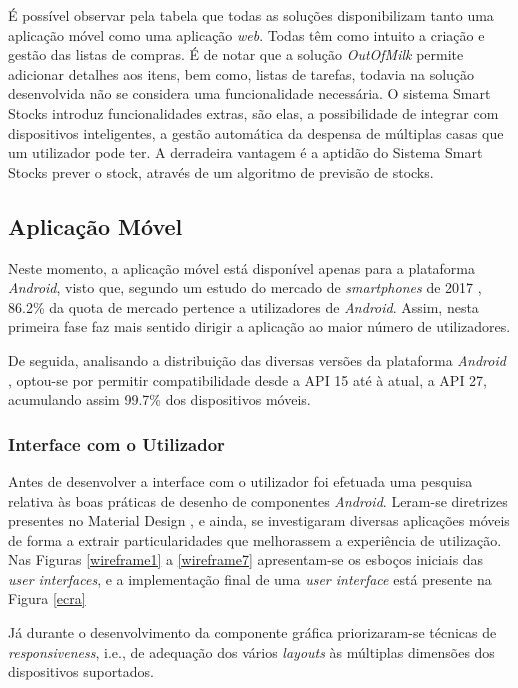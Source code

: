 É possível observar pela tabela que todas as soluções disponibilizam tanto uma aplicação móvel como uma aplicação \textit{web}. Todas têm como intuito a criação e gestão das listas de compras. É de notar que a solução \textit{OutOfMilk} permite adicionar detalhes aos itens, bem como, listas de tarefas, todavia na solução desenvolvida não se considera uma funcionalidade necessária. O sistema Smart Stocks introduz funcionalidades extras, são elas, a possibilidade de integrar com dispositivos inteligentes, a gestão automática da despensa de múltiplas casas que um utilizador pode ter. A derradeira vantagem é a aptidão do Sistema Smart Stocks prever o stock, através de um algoritmo de previsão de stocks.

\subsection{Aplicação Móvel}

Neste momento, a aplicação móvel está disponível apenas para a plataforma \textit{Android}, visto que, segundo um estudo do mercado de \textit{smartphones} de 2017 \cite{AppleVsAndroid:comparative}, 86.2\% da quota de mercado pertence a utilizadores de \textit{Android}. Assim, nesta primeira fase faz mais sentido dirigir a aplicação ao maior número de utilizadores.

De seguida, analisando a distribuição das diversas versões da plataforma \textit{Android} \cite{Distribution:android}, optou-se por permitir compatibilidade desde a API 15 até à atual, a API 27, acumulando assim 99.7\% dos dispositivos móveis.
 
 
\subsubsection{Interface com o Utilizador}

Antes de desenvolver a interface com o utilizador foi efetuada uma pesquisa relativa às boas práticas de desenho de componentes \textit{Android}. Leram-se diretrizes presentes no Material Design \cite{MaterialDesign:homepage}, e ainda, se investigaram diversas aplicações móveis de forma a extrair particularidades que melhorassem a experiência de utilização. Nas Figuras \ref{wireframe1} a \ref{wireframe7} apresentam-se os esboços iniciais das \textit{user interfaces}, e a implementação final de uma \textit{user interface} está presente na Figura \ref{ecra}

Já durante o desenvolvimento da componente gráfica priorizaram-se técnicas de \textit{responsiveness}, i.e., de adequação dos vários \textit{layouts} às múltiplas dimensões dos dispositivos suportados.


